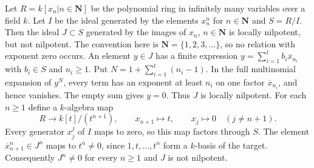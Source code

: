 \begin{example}
\label{example-locally-nilpotent-not-nilpotent}
Let $R = k[x_n | n \in \mathbf{N}]$ be the polynomial ring in infinitely
many variables over a field $k$. Let $I$ be the ideal generated by
the elements $x_n^n$ for $n \in \mathbf{N}$ and $S = R/I$. Then the ideal
$J \subset S$ generated by the images of $x_n$, $n \in \mathbf{N}$
is locally nilpotent, but not nilpotent. The convention here is
$\mathbf N=\{1,2,3,\ldots\}$, so no relation with exponent zero occurs.
An element $y\in J$ has a finite expression
$y=\sum_{i=1}^t b_i\overline{x}_{n_i}$ with $b_i\in S$ and $n_i\geq1$.
Put $N=1+\sum_{i=1}^t(n_i-1)$. In the full multinomial expansion
of $y^N$, every term has an exponent at least $n_i$ on one factor
$\overline{x}_{n_i}$, and hence vanishes. The empty sum gives $y=0$.
Thus $J$ is locally nilpotent.
For each $n\geq1$ define a $k$-algebra map
$$
R\longrightarrow k[t]/(t^{n+1}),\qquad
x_{n+1}\longmapsto t,\qquad x_j\longmapsto0\quad(j\ne n+1).
$$
Every generator $x_j^j$ of $I$ maps to zero, so this map factors
through $S$. The element $\overline{x}_{n+1}^n\in J^n$ maps to
$t^n\ne0$, since $1,t,\ldots,t^n$ form a $k$-basis of the target.
Consequently $J^n\ne0$ for every $n\geq1$ and $J$ is not nilpotent.
\end{example}